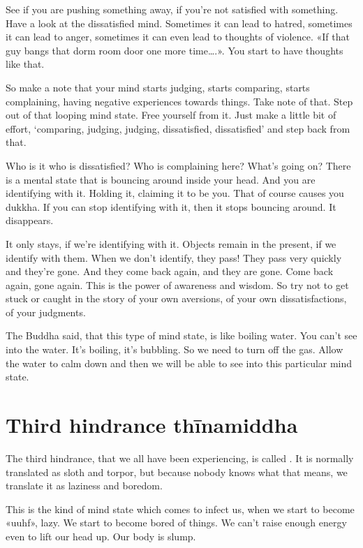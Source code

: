 \documentclass[letterpaper,10pt,english]{sphinxmanual}
\begin{document}
\sphinxAtStartPar
See  if  you  are  pushing  something  away,  if  you’re  not  satisfied  with
something. Have a look at the dissatisfied mind. Sometimes it can lead to
hatred, sometimes it can lead to anger, sometimes it can even lead to thoughts
of violence. «If that guy bangs that dorm room door one more time….». You
start to have thoughts like that.

\sphinxAtStartPar
So make a note that your mind starts judging, starts comparing, starts
complaining, having negative experiences towards things. Take note of that.
Step out of that looping mind state. Free yourself from it. Just make a little
bit of effort, ‘comparing, judging, judging, dissatisfied, dissatisfied’ and step
back from that.

\sphinxAtStartPar
Who is it who is dissatisfied? Who is complaining here? What’s going
on? There is a mental state that is bouncing around inside your head. And
you are identifying with it. Holding it, claiming it to be you. That of course
causes you dukkha. If you can stop identifying with it, then it stops bouncing
around. It disappears.

\sphinxAtStartPar
It only stays, if we’re identifying with it. Objects remain in the present, if we identify with them. When we don’t identify, they pass! They pass
very quickly and they’re gone. And they come back again, and they are gone.
Come back again, gone again. This is the power of awareness and wisdom.
So try not to get stuck or caught in the story of your own aversions, of your
own dissatisfactions, of your judgments.

\sphinxAtStartPar
The Buddha said, that this type of mind state, is like boiling water. You
can’t see into the water. It’s boiling, it’s bubbling. So we need to turn off the
gas. Allow the water to calm down and then we will be able to see into this
particular mind state.


\section{Third hindrance thīnamiddha}
\label{\detokenize{3-a:third-hindrance-thinamiddha}}
\sphinxAtStartPar
{}  The  third  hindrance,  that  we  all  have  been  experiencing,  is  called
.  It  is  normally  translated  as  sloth  and  torpor,  but  because
nobody knows what that means, we translate it as laziness and boredom.

\sphinxAtStartPar
This is the kind of mind state which comes to infect us, when we start
to become «uuhf», lazy. We start to become bored of things. We can’t raise
enough energy even to lift our head up. Our body is slump.
\end{document}
